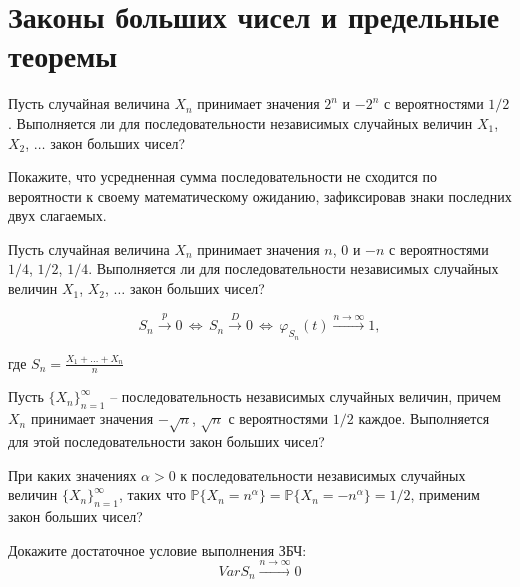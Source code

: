 \section{Законы больших чисел и предельные теоремы}

\begin{problem}
Пусть случайная величина $X_n$ принимает значения 
$2^n$ и $-2^n$ с вероятностями $1/2$. Выполняется ли для последовательности независимых случайных величин 
$X_1$, $X_2$, $\ldots$ закон больших чисел? 
\end{problem}

\begin{ordre}
Покажите, что усредненная сумма последовательности не сходится по вероятности к своему математическому ожиданию, зафиксировав знаки последних двух слагаемых. 
\end{ordre}


\begin{problem}
Пусть случайная величина $X_n$ принимает значения 
$n$, $0$ и $-n$ с вероятностями $1/4$, $1/2$, $1/4$. Выполняется ли для последовательности независимых случайных величин 
$X_1$, $X_2$, $\ldots$ закон больших чисел? 
\end{problem}

\begin{ordre}
 
$$
S_n\xrightarrow{p}0 \,\Leftrightarrow\, S_n\xrightarrow{D}0 \,\Leftrightarrow\, \varphi_{S_n}(t)
\xrightarrow{n\to\infty}1 , 
$$

где $S_n=\frac{X_1+\ldots +X_n}{n}$

\end{ordre}


\begin{problem}
Пусть $\{ X_n\}_{n=1}^{\infty}$ -- последовательность независимых случайных величин, причем $X_n$ принимает значения 
$-\sqrt{n}$, $\sqrt{n}$ с вероятностями $1/2$ каждое. 
Выполняется для этой последовательности закон больших чисел? 
\end{problem}


\begin{problem}
При каких значениях $\alpha > 0$ к последовательности независимых случайных величин $\{ X_n\}_{n=1}^{\infty}$, 
таких что ${\mathbb P}\{ X_n=n^{\alpha}\}={\mathbb P}\{ X_n=-n^{\alpha}\}=1/2$, применим закон больших чисел? 
\end{problem}

\begin{ordre}
Докажите достаточное условие выполнения ЗБЧ:
 \[
Var S_n \xrightarrow {n\to\infty}0
\] 
\end{ordre}


